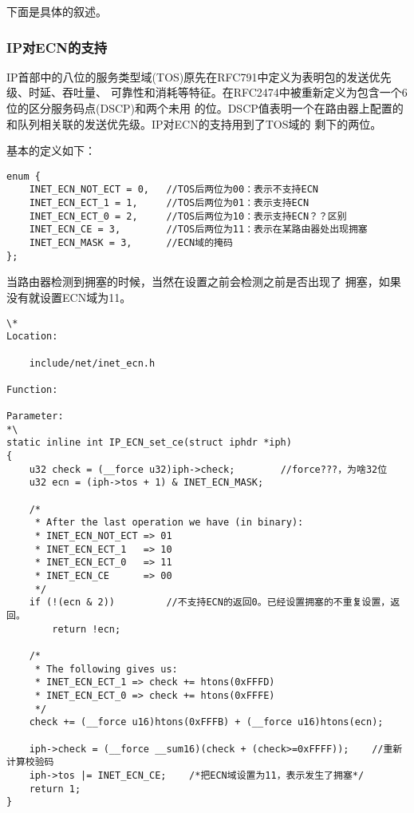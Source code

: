 		下面是具体的叙述。

		\subsubsection{IP对ECN的支持}

			IP首部中的八位的服务类型域(TOS)原先在RFC791中定义为表明包的发送优先级、时延、吞吐量、
			可靠性和消耗等特征。在RFC2474中被重新定义为包含一个6位的区分服务码点(DSCP)和两个未用
			的位。DSCP值表明一个在路由器上配置的和队列相关联的发送优先级。IP对ECN的支持用到了TOS域的
			剩下的两位。

			基本的定义如下：
\begin{verbatim}
enum {
	INET_ECN_NOT_ECT = 0,	//TOS后两位为00：表示不支持ECN
	INET_ECN_ECT_1 = 1,		//TOS后两位为01：表示支持ECN
	INET_ECN_ECT_0 = 2,		//TOS后两位为10：表示支持ECN？？区别
	INET_ECN_CE = 3,		//TOS后两位为11：表示在某路由器处出现拥塞
	INET_ECN_MASK = 3,		//ECN域的掩码
};
\end{verbatim}


			当路由器检测到拥塞的时候，当然在设置之前会检测之前是否出现了
			拥塞，如果没有就设置ECN域为11。

\begin{verbatim}
\*
Location:

	include/net/inet_ecn.h

Function:

Parameter:
*\
static inline int IP_ECN_set_ce(struct iphdr *iph)
{
	u32 check = (__force u32)iph->check;		//force???，为啥32位
	u32 ecn = (iph->tos + 1) & INET_ECN_MASK;

	/*
	 * After the last operation we have (in binary):
	 * INET_ECN_NOT_ECT => 01
	 * INET_ECN_ECT_1   => 10
	 * INET_ECN_ECT_0   => 11
	 * INET_ECN_CE      => 00
	 */
	if (!(ecn & 2))			//不支持ECN的返回0。已经设置拥塞的不重复设置，返回。
		return !ecn;
	
	/*
	 * The following gives us:
	 * INET_ECN_ECT_1 => check += htons(0xFFFD)
	 * INET_ECN_ECT_0 => check += htons(0xFFFE)
	 */
	check += (__force u16)htons(0xFFFB) + (__force u16)htons(ecn);

	iph->check = (__force __sum16)(check + (check>=0xFFFF));	//重新计算校验码
	iph->tos |= INET_ECN_CE;	/*把ECN域设置为11，表示发生了拥塞*/
	return 1;
}
\end{verbatim}


